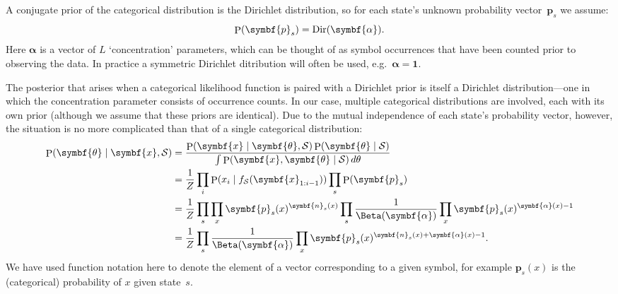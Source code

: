 \documentclass[12pt,a4paper]{article}
\newcommand\mc[1]{\mathcal{#1}}               %
\newcommand\ub[1]{\symbf{#1}}                 %
\DeclareMathOperator\Pb{P}                    %
\DeclarePairedDelimiter\lr{\lparen}{\rparen}  %
\DeclareMathOperator\dir{Dir} %
\begin{document}
A conjugate prior of the categorical distribution is the Dirichlet distribution,
so for each state's unknown probability vector~\(\ub{p}_s\) we assume:
\begin{equation*}
  \Pb\lr{\ub{p}_s} = \dir\lr{\ub{\alpha}}.
\end{equation*}
Here \(\ub{\alpha}\) is a vector of \(L\) `concentration' parameters, which can
be thought of as symbol occurrences that have been counted prior to observing
the data. In practice a symmetric Dirichlet ditribution will often be used,
e.g.~\(\ub{\alpha} = \ub{1}\).

The posterior that arises when a categorical likelihood function is paired with
a Dirichlet prior is itself a Dirichlet distribution---one in which the
concentration parameter consists of occurrence counts. In our case, multiple
categorical distributions are involved, each with its own prior (although we
assume that these priors are identical). Due to the mutual independence of each
state's probability vector, however, the situation is no more complicated than
that of a single categorical distribution:
\begin{align*}
  \Pb\lr{\ub{\theta} \mid \ub{x}, \mc{S}} &=
    \frac{\Pb\lr{\ub{x} \mid \ub{\theta}, \mc{S}}
    \Pb\lr{\ub{\theta} \mid \mc{S}}}
    {\int \Pb\lr{\ub{x}, \ub{\theta} \mid \mc{S}}\, d\theta} \\
  &= \frac{1}{Z} \prod_i \Pb\lr{x_i \mid f_{\mc{S}}\lr{\ub{x}_{1:i-1}}}
    \prod_s \Pb\lr{\ub{p}_s} \\
  &= \frac{1}{Z} \prod_s \prod_x \ub{p}_s(x)^{\ub{n}_s(x)} \prod_s
    \frac{1}{\Beta\lr{\ub{\alpha}}} \prod_x \ub{p}_s(x)^{\ub{\alpha}(x)-1} \\
  &= \frac{1}{Z} \prod_s \frac{1}{\Beta\lr{\ub{\alpha}}}
    \prod_x \ub{p}_s(x)^{\ub{n}_s(x)+\ub{\alpha}(x)-1}.
\end{align*}
We have used function notation here to denote the element of a vector
corresponding to a given symbol, for example \(\ub{p}_s(x)\) is the
(categorical) probability of \(x\) given state~\(s\).
\end{document}
